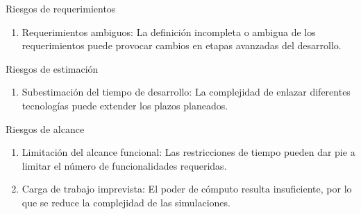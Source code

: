 \begin{frame}{Riesgos de requerimientos}
	\begin{enumerate}[label*=RR\arabic*]
		\item Requerimientos ambiguos: La definición incompleta o ambigua de los requerimientos puede provocar cambios en etapas avanzadas del desarrollo.
	\end{enumerate}
\end{frame}

\begin{frame}{Riesgos de estimación}
	\begin{enumerate}[label*=RE\arabic*]
		\item Subestimación del tiempo de desarrollo: La complejidad de enlazar diferentes tecnologías puede extender los plazos planeados.
	\end{enumerate}
\end{frame}

\begin{frame}{Riesgos de alcance}
	\begin{enumerate}[label*=RA\arabic*]
		\item Limitación del alcance funcional: Las restricciones de tiempo pueden dar pie a limitar el número de funcionalidades requeridas.
		
		\item Carga de trabajo imprevista: El poder de cómputo resulta insuficiente, por lo que se reduce la complejidad de las simulaciones.
	\end{enumerate}
\end{frame}

